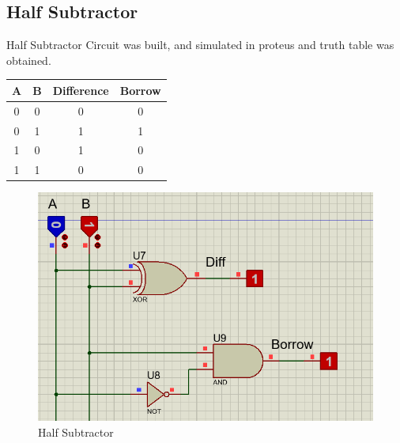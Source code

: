 \documentclass[a4paper, 12pt]{article}
\begin{document}
\pagebreak

\subsection{Half Subtractor}
Half Subtractor Circuit was built, and simulated in proteus and truth table was obtained.
	\begin{center}
	\begin{tabular}[h]{|c|c|c|c|}
	\hline
	A & B & Difference & Borrow \\
	\hline
	0 & 0 & 0 & 0 \\
	0 & 1 & 1 & 1 \\
	1 & 0 & 1 & 0 \\
	1 & 1 & 0 & 0 \\
	\hline
	\end{tabular}
	\end{center}
\begin{figure}[h]
	\centering
	\includegraphics[scale=0.4]{half-sub.png}
	\caption{Half Subtractor}
\end{figure}
\pagebreak
\end{document}
